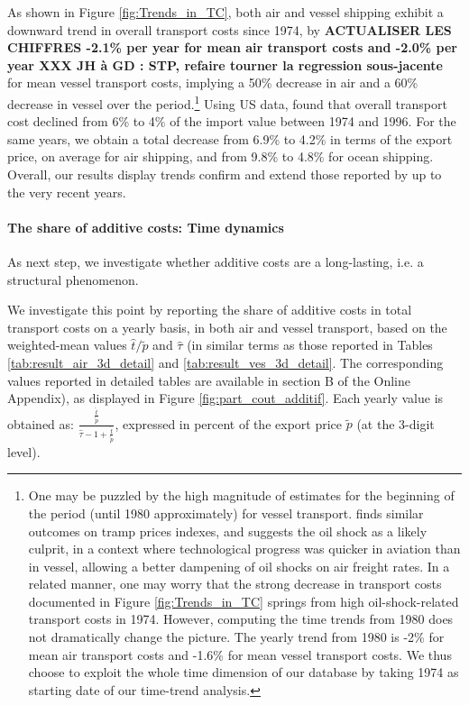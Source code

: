 \documentclass[a4paper,11pt]{article}
\begin{document}
As shown in Figure \ref{fig:Trends_in_TC}, both air and vessel shipping exhibit a downward trend in overall transport costs since 1974, by \textbf{ACTUALISER LES CHIFFRES -2.1\% per year for mean air transport costs and -2.0\% per year XXX JH à GD : STP, refaire tourner la regression sous-jacente} for mean vessel transport costs, implying a 50\% decrease in air and a 60\% decrease in vessel over the period.\footnote{One may be puzzled by the high magnitude of estimates for the beginning of the period (until 1980 approximately) for vessel transport.
\cite{hummels2007} finds similar outcomes on tramp prices indexes, and suggests the oil shock as a likely culprit, in a context where technological progress was quicker in aviation than in vessel, allowing a better dampening of oil shocks on air freight rates.
In a related manner, one may worry that the strong decrease in transport costs documented in Figure \ref{fig:Trends_in_TC} springs from high oil-shock-related transport costs in 1974. However, computing the time trends from 1980 does not dramatically change the picture.
The yearly trend from 1980 is -2\% for mean air transport costs and -1.6\% for mean vessel transport costs.
We thus choose to exploit the whole time dimension of our database by taking 1974 as starting date of our time-trend analysis.} Using US data, \cite{Hummels_1999} found that overall transport cost declined from 6\% to 4\% of the import value between 1974 and 1996.
For the same years, we obtain a total decrease from 6.9\% to 4.2\% in terms of the export price, on average for air shipping, and from 9.8\% to 4.8\% for ocean shipping. Overall, our results display trends confirm and extend those reported by \cite{Hummels_1999} up to the very recent years.\smallskip

\paragraph{The share of additive costs: Time dynamics} As next step, we investigate whether additive costs are a long-lasting, i.e. a structural phenomenon.

We investigate this point by reporting the share of additive costs in total transport costs on a yearly basis, in both air and vessel transport, based on the weighted-mean values $\widehat{t}/\widetilde{p}$ and $\widehat{\tau}$ (in similar terms as those reported in Tables \ref{tab:result_air_3d_detail} and \ref{tab:result_ves_3d_detail}.
The corresponding values reported in detailed tables are available in section B of the Online Appendix), as displayed in Figure \ref{fig:part_cout_additif}.
Each yearly value is obtained as: $\frac{\frac{\widehat{t}}{\widetilde{p}}}{\widehat{\tau}-1+\frac{\widehat{t}}{\widetilde{p}}}$, expressed in percent of the export price $\widetilde{p}$ (at the 3-digit level).
\end{document}
